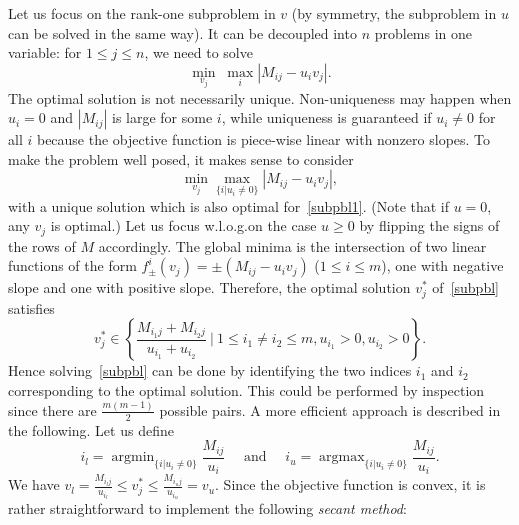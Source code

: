 \documentclass[a4paper,11pt]{article}
\numberwithin{equation}{section}
\DeclareMathOperator{\argmin}{argmin}
\DeclareMathOperator{\argmax}{argmax}
\begin{document}
Let us focus on the rank-one subproblem in $v$ (by symmetry, the subproblem in $u$ can be solved in the same way). 
It can be decoupled into $n$ problems in one variable: for $1 \leq j \leq n$, 
we need to solve  
\begin{equation} \label{subpbl1}
 \min_{v_j} \; \max_{i} |M_{ij} - u_i v_j|. 
\end{equation}
The optimal solution is not necessarily unique. Non-uniqueness may happen when $u_i = 0$ and $|M_{ij}|$ is large for some $i$, while uniqueness is guaranteed if $u_i \neq 0$ for all $i$ because the objective function is piece-wise linear with nonzero slopes. 
To make the problem well posed, it makes sense to consider 
\begin{equation} \label{subpbl}
 \min_{v_j} \max_{ \{ i | u_i \neq 0 \} } |M_{ij} - u_i v_j|, 
\end{equation}
with a unique solution which is also optimal for~\eqref{subpbl1}. (Note that if $u = 0$, any $v_j$ is optimal.)   
Let us focus w.l.o.g.\@ on the case $u \geq 0$ by flipping the signs of the rows of $M$ accordingly. 
The global minima is the intersection of two linear functions of the form $f^i_{\pm}(v_j) = \pm(M_{ij} - u_i v_j)$ 
($1 \leq i \leq m$), one with negative slope and one with positive slope. 
Therefore, the optimal solution $v_j^*$ of~\eqref{subpbl} satisfies 
\[ 
v_j^* \in \left\{  \frac{M_{i_1j} + M_{i_2j}}{u_{i_1} + u_{i_2}}  \ \big| \ 1 \leq i_1 \neq i_2 \leq m, u_{i_1} > 0,  u_{i_2} > 0 \right\} . 
\]
Hence solving~\eqref{subpbl} can be done by identifying the two indices $i_1$ and $i_2$ corresponding to the optimal solution. This could be performed by inspection since there are $\frac{m(m-1)}{2}$ possible pairs. 
A more efficient approach is described in the following. Let us define 
\[
i_l = \argmin_{\{ i | u_i \neq 0 \}} \frac{M_{ij}}{u_i} 
\quad 
\text{ and } 
\quad 
i_u = \argmax_{\{ i | u_i \neq 0 \}} \frac{M_{ij}}{u_i}.  
\]
We have $v_l = \frac{M_{i_l j}}{u_{i_l}}  \leq v_j^* \leq   \frac{M_{i_u j}}{u_{i_u}} = v_u$. Since the objective function is convex, 
it is rather straightforward to implement the following \textit{secant method}: 
\end{document}
